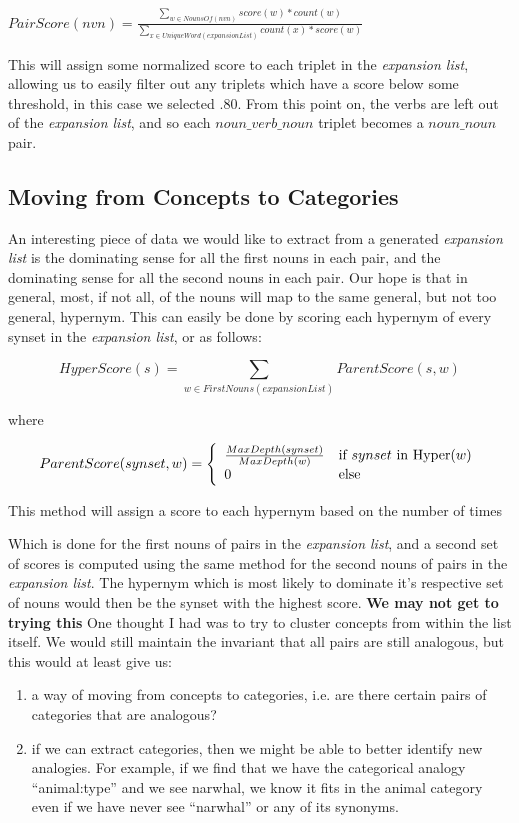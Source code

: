 \documentclass[11pt]{article}
\begin{document}
\small
$ PairScore(nvn) = \frac {\displaystyle\sum_{w \in NounsOf(nvn)} {score(w) * count(w)}}
                          {\displaystyle\sum_{x \in UniqueWord(expansionList)}
                          {count(x)} * score(w)} $ 
\normalsize

This will assign some normalized score to each triplet in the \emph{expansion
list},
allowing us to easily filter out any triplets which have a score below some
threshold, in this case we selected \(.80\).  From this point on, the verbs are
left out of the \emph{expansion list}, and so each $noun\_verb\_noun$ triplet becomes a
$noun\_noun$ pair.

\subsection{Moving from Concepts to Categories}

An interesting piece of data we would like to extract from a generated
\emph{expansion list} is the dominating sense for all the first nouns in each
pair, and the dominating sense for all the second nouns in each pair.  Our hope
is that in general, most, if not all, of the nouns will map to the same general, but
not too general, hypernym.  This can easily be done by scoring each hypernym of
every synset in the \emph{expansion list}, or as follows:

\small
\[ HyperScore(s) = \displaystyle\sum_{w \in FirstNouns(expansionList)}
ParentScore(s, w) 
\]

\normalsize
where

\small
\[ ParentScore(synset, w) = \left\{ 
 \begin{array}{l l}
   {\frac {MaxDepth(synset)} {MaxDepth(w)}} & \mbox{if $synset$ in Hyper($w$)}\\
   0 & \mbox{else}\\
 \end{array} \right.
\]

\normalsize
This method will assign a score to each hypernym based on the number of times 

Which is done for the first nouns of pairs in the \emph{expansion list}, and a
second set of scores is computed using the same method for the second nouns of
pairs in the \emph{expansion list}.  The hypernym which is most likely to
dominate it's respective set of nouns would then be the synset with the highest
score.  
{\bf We may not get to trying this} One thought I had was to try to cluster
concepts from within the list itself.  We would still maintain the invariant
that all pairs are still analogous, but this would at least give us:
\begin{enumerate}
  \item a way of moving from concepts to categories, i.e. are there certain
    pairs of categories that are analogous?
  \item if we can extract categories, then we might be able to better identify
    new analogies.  For example, if we find that we have the categorical analogy
    ``animal:type'' and we see narwhal, we know it fits in the animal category
    even if we have never see ``narwhal'' or any of its synonyms.
\end{enumerate}
\end{document}
